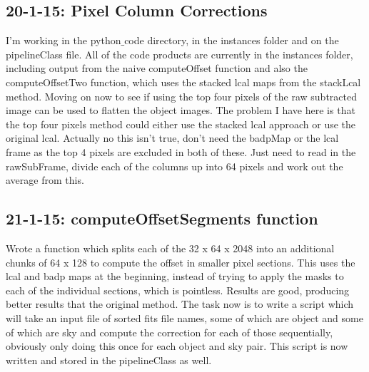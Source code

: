 \documentclass{literature}
\begin{document}
\subsection{20-1-15: Pixel Column Corrections}
I'm working in the python$\_$code directory, in the instances folder and on the pipelineClass file. All of the code products are currently in the instances folder, including output from the naive computeOffset function and also the computeOffsetTwo function, which uses the stacked lcal maps from the stackLcal method. Moving on now to see if using the top four pixels of the raw subtracted image can be used to flatten the object images. The problem I have here is that the top four pixels method could either use the stacked lcal approach or use the original lcal. Actually no this isn't true, don't need the badpMap or the lcal frame as the top 4 pixels are excluded in both of these. Just need to read in the rawSubFrame, divide each of the columns up into 64 pixels and work out the average from this.  \\ 
\subsection{21-1-15: computeOffsetSegments function} 
Wrote a function which splits each of the 32 x 64 x 2048 into an additional chunks of 64 x 128 to compute the offset in smaller pixel sections. This uses the lcal and badp maps at the beginning, instead of trying to apply the masks to each of the individual sections, which is pointless. Results are good, producing better results that the original method. The task now is to write a script which will take an input file of sorted fits file names, some of which are object and some of which are sky and compute the correction for each of those sequentially, obviously only doing this once for each object and sky pair. This script is now written and stored in the pipelineClass as well. 
\end{document}
